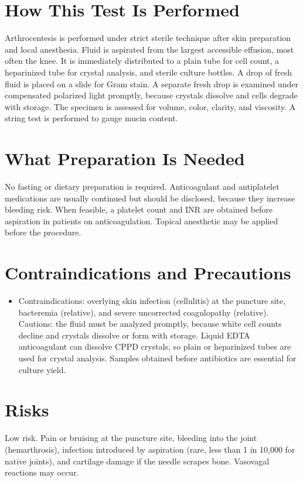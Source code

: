 \section*{How This Test Is Performed}
Arthrocentesis is performed under strict sterile technique after skin preparation and local anesthesia. Fluid is aspirated from the largest accessible effusion, most often the knee. It is immediately distributed to a plain tube for cell count, a heparinized tube for crystal analysis, and sterile culture bottles. A drop of fresh fluid is placed on a slide for Gram stain. A separate fresh drop is examined under compensated polarized light promptly, because crystals dissolve and cells degrade with storage. The specimen is assessed for volume, color, clarity, and viscosity. A string test is performed to gauge mucin content.
\section*{What Preparation Is Needed}
No fasting or dietary preparation is required. Anticoagulant and antiplatelet medications are usually continued but should be disclosed, because they increase bleeding risk. When feasible, a platelet count and INR are obtained before aspiration in patients on anticoagulation. Topical anesthetic may be applied before the procedure.
\section*{Contraindications and Precautions}
\begin{itemize}
  \item Contraindications: overlying skin infection (cellulitis) at the puncture site, bacteremia (relative), and severe uncorrected coagulopathy (relative). Cautions: the fluid must be analyzed promptly, because white cell counts decline and crystals dissolve or form with storage. Liquid EDTA anticoagulant can dissolve CPPD crystals, so plain or heparinized tubes are used for crystal analysis. Samples obtained before antibiotics are essential for culture yield.
\end{itemize}
\section*{Risks}
Low risk. Pain or bruising at the puncture site, bleeding into the joint (hemarthrosis), infection introduced by aspiration (rare, less than 1 in 10,000 for native joints), and cartilage damage if the needle scrapes bone. Vasovagal reactions may occur.
